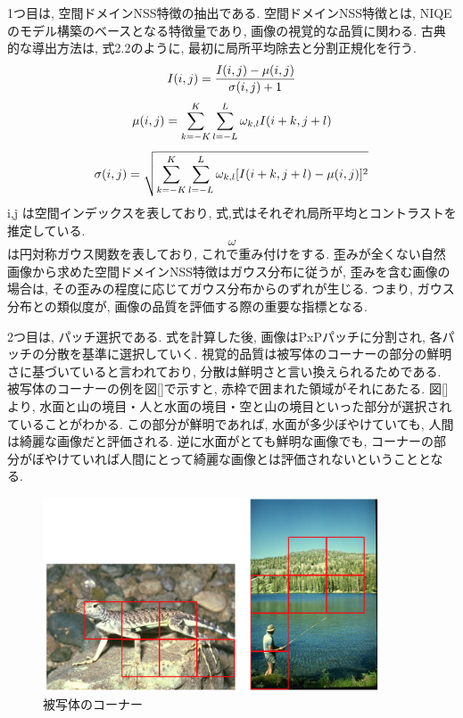 \documentclass[a4paper,12pt]{jsreport}
\begin{document}
1つ目は, 空間ドメインNSS特徴の抽出である. 空間ドメインNSS特徴とは, NIQEのモデル構築のベースとなる特徴量であり, 画像の視覚的な品質に関わる. 古典的な導出方法は, 式2.2のように, 最初に局所平均除去と分割正規化を行う. 
\begin{equation}
 I(i,j) = \frac{I(i,j) - \mu(i,j)}{\sigma(i,j) + 1}\\ 
\end{equation}
 \begin{equation}
 \mu(i,j) = \sum_{k=-K}^K \sum_{l=-L}^L \omega_{k,l} I(i+k, j+l)\\ 
\end{equation}
\begin{equation}
 \sigma(i,j) = \sqrt{\sum_{k=-K}^K \sum_{l=-L}^L \omega_{k,l} [I(i+k, j+l)-\mu(i,j)]^2}\\ 
\end{equation}
i,j は空間インデックスを表しており, 式,式はそれぞれ局所平均とコントラストを推定している. $$\omega$$は円対称ガウス関数を表しており, これで重み付けをする. 歪みが全くない自然画像から求めた空間ドメインNSS特徴はガウス分布に従うが, 歪みを含む画像の場合は, その歪みの程度に応じてガウス分布からのずれが生じる. つまり, ガウス分布との類似度が,  画像の品質を評価する際の重要な指標となる.

2つ目は, パッチ選択である. 式を計算した後, 画像はPxPパッチに分割され, 各パッチの分散を基準に選択していく. 視覚的品質は被写体のコーナーの部分の鮮明さに基づいていると言われており, 分散は鮮明さと言い換えられるためである. 被写体のコーナーの例を図[]で示すと, 赤枠で囲まれた領域がそれにあたる. 図[]より, 水面と山の境目・人と水面の境目・空と山の境目といった部分が選択されていることがわかる. この部分が鮮明であれば, 水面が多少ぼやけていても, 人間は綺麗な画像だと評価される. 逆に水面がとても鮮明な画像でも, コーナーの部分がぼやけていれば人間にとって綺麗な画像とは評価されないということとなる. 

\begin{figure}[h]
  \begin{center}
    \includegraphics[width=10cm]{./NIQE.png}
    \caption{被写体のコーナー}
  \end{center}
\end{figure}
\end{document}
